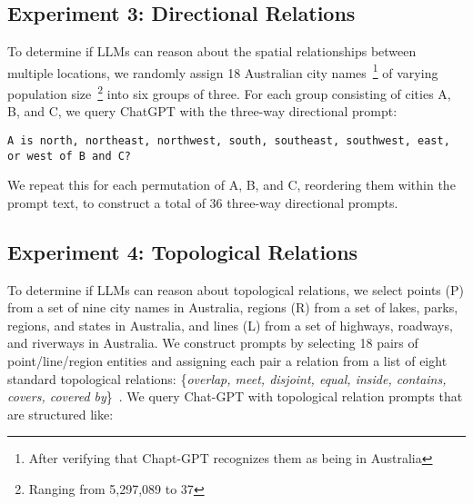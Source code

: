 

\subsection{Experiment 3: Directional Relations}
To determine if LLMs can reason about the spatial relationships between multiple locations, we randomly assign 18 Australian city names~\footnote{After verifying that Chapt-GPT recognizes them as being in Australia} of varying population size~\footnote{Ranging from 5,297,089 to 37} into six groups of three.
For each group consisting of cities A, B, and C, we query ChatGPT with the three-way directional prompt: 

\begin{lstlisting}[title=text here]
    A is north, northeast, northwest, south, southeast, southwest, east, or west of B and C?
\end{lstlisting}





We repeat this for each permutation of A, B, and C, reordering them within the prompt text, to construct a total of 36 three-way directional prompts.



\subsection{Experiment 4: Topological Relations}

To determine if LLMs can reason about topological relations, we select points (P) from a set of nine city names in Australia, regions (R) from a set of lakes, parks, regions, and states in Australia, and lines (L) from a set of highways, roadways, and riverways in Australia.
We construct prompts by selecting 18 pairs of point/line/region entities and assigning each pair a relation from a list of eight standard topological relations: \{\textit{overlap, meet, disjoint, equal, inside, contains, covers, covered by}\}~\cite{Carniel2023}.
We query Chat-GPT with topological relation prompts that are structured like:

